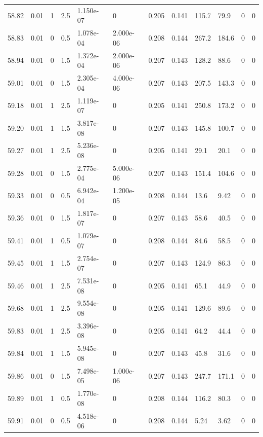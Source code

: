 \documentclass[preview]{standalone}
\begin{document}
{{{{{{{{{{{{{{{{{{{\begin{tabular}{L{1.2cm}C{1.2cm} C{0.3cm}C{0.5cm} C{1.4cm}C{1.4cm} C{1.4cm}C{1.4cm} C{1.6cm}C{1.6cm} C{1.6cm}C{1.6cm}}
  58.82  &  0.01  & 1     & 2.5 &  1.150e-07  & 0  &  0.205&   0.141& 115.7 & 79.9   &  0 & 0  \\ 
  58.83  &  0.01  & 0     & 0.5 &  1.078e-04  & 2.000e-06  &  0.208&   0.144& 267.2 & 184.6   &  0 & 0  \\ 
  58.94  &  0.01  & 0     & 1.5 &  1.372e-04  & 2.000e-06  &  0.207&   0.143& 128.2 & 88.6   &  0 & 0  \\ 
  59.01  &  0.01  & 0     & 1.5 &  2.305e-04  & 4.000e-06  &  0.207&   0.143& 207.5 & 143.3   &  0 & 0  \\ 
  59.18  &  0.01  & 1     & 2.5 &  1.119e-07  & 0  &  0.205&   0.141& 250.8 & 173.2   &  0 & 0  \\ 
  59.20  &  0.01  & 1     & 1.5 &  3.817e-08  & 0  &  0.207&   0.143& 145.8 & 100.7   &  0 & 0  \\ 
  59.27  &  0.01  & 1     & 2.5 &  5.236e-08  & 0  &  0.205&   0.141& 29.1 & 20.1   &  0 & 0  \\ 
  59.28  &  0.01  & 0     & 1.5 &  2.775e-04  & 5.000e-06  &  0.207&   0.143& 151.4 & 104.6   &  0 & 0  \\ 
  59.33  &  0.01  & 0     & 0.5 &  6.942e-04  & 1.200e-05  &  0.208&   0.144& 13.6 & 9.42   &  0 & 0  \\ 
  59.36  &  0.01  & 0     & 1.5 &  1.817e-07  & 0  &  0.207&   0.143& 58.6 & 40.5   &  0 & 0  \\ 
  59.41  &  0.01  & 1     & 0.5 &  1.079e-07  & 0  &  0.208&   0.144& 84.6 & 58.5   &  0 & 0  \\ 
  59.45  &  0.01  & 1     & 1.5 &  2.754e-07  & 0  &  0.207&   0.143& 124.9 & 86.3   &  0 & 0  \\ 
  59.46  &  0.01  & 1     & 2.5 &  7.531e-08  & 0  &  0.205&   0.141& 65.1 & 44.9   &  0 & 0  \\ 
  59.68  &  0.01  & 1     & 2.5 &  9.554e-08  & 0  &  0.205&   0.141& 129.6 & 89.6   &  0 & 0  \\ 
  59.83  &  0.01  & 1     & 2.5 &  3.396e-08  & 0  &  0.205&   0.141& 64.2 & 44.4   &  0 & 0  \\ 
  59.84  &  0.01  & 1     & 1.5 &  5.945e-08  & 0  &  0.207&   0.143& 45.8 & 31.6   &  0 & 0  \\ 
  59.86  &  0.01  & 0     & 1.5 &  7.498e-05  & 1.000e-06  &  0.207&   0.143& 247.7 & 171.1   &  0 & 0  \\ 
  59.89  &  0.01  & 1     & 0.5 &  1.770e-08  & 0  &  0.208&   0.144& 116.2 & 80.3   &  0 & 0  \\ 
  59.91  &  0.01  & 0     & 0.5 &  4.518e-06  & 0  &  0.208&   0.144& 5.24 & 3.62   &  0 & 0  \\ 

\end{tabular}}}}}}}}}}}}}}}}}}}}
\end{document}
